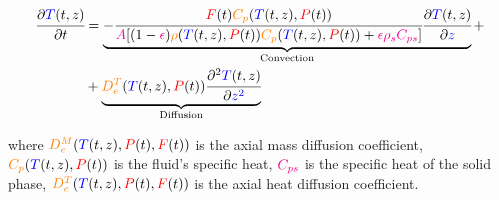 \documentclass[../Article_Model_Parameters.tex]{subfiles}
\begin{document}
			{\footnotesize
				\begin{equation} \label{Model_heat}
					\begin{split}
						\cfrac{\partial {\color{blue}T}(t,z)}{\partial t} &= 
						\underbrace{ -\cfrac{{\color{red}F}(t) {\color{orange}C_p}({\color{blue}T}(t,z),{\color{red}P}(t))}{{\color{magenta}A} 	[(1-{\color{magenta}\epsilon}){\color{orange}\rho}({\color{blue}T}(t,z),{\color{red}P}(t)) {\color{orange}C_p} ({\color{blue}T}(t,z),{\color{red}P}(t)) + {\color{magenta} \epsilon \rho_s C_{ps} } ]} \cfrac{\partial {\color{blue}T}(t,z)}{\partial {\color{blue}z}}  }_{\text{Convection}} + \\
						& + \underbrace{ {\color{orange}D^T_e}({\color{blue}T}(t,z),{\color{red}P}(t)) \cfrac{\partial^2 {\color{blue}T}(t,z)}{\partial {\color{blue}z^2}} }_{\text{Diffusion}}
					\end{split}
			\end{equation} }
			
		where $ {\color{orange}D^M_e}({\color{blue}T}(t,z),{\color{red}P}(t),{\color{red}F}(t))$ is the axial mass diffusion coefficient, ${\color{orange}C_p}({\color{blue}T}(t,z),{\color{red}P}(t))$ is the fluid's specific heat, ${\color{magenta}C_{ps}}$ is the specific heat of the solid phase, ${\color{orange}D^T_e}({\color{blue}T}(t,z),{\color{red}P}(t),{\color{red}F}(t))$ is the axial heat diffusion coefficient. 

\end{document}
